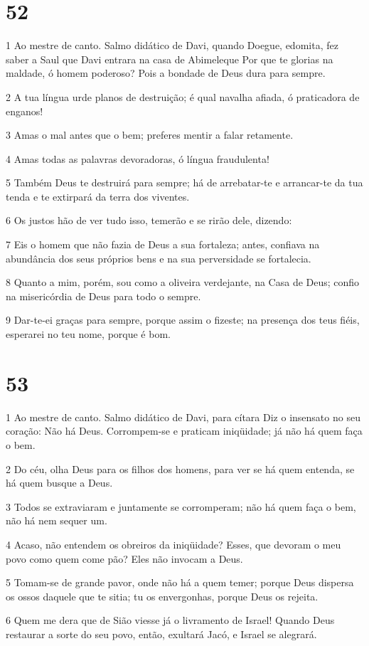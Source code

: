 \chapter{52}

\par 1 Ao mestre de canto. Salmo didático de Davi, quando Doegue, edomita, fez saber a Saul que Davi entrara na casa de Abimeleque Por que te glorias na maldade, ó homem poderoso? Pois a bondade de Deus dura para sempre.
\par 2 A tua língua urde planos de destruição; é qual navalha afiada, ó praticadora de enganos!
\par 3 Amas o mal antes que o bem; preferes mentir a falar retamente.
\par 4 Amas todas as palavras devoradoras, ó língua fraudulenta!
\par 5 Também Deus te destruirá para sempre; há de arrebatar-te e arrancar-te da tua tenda e te extirpará da terra dos viventes.
\par 6 Os justos hão de ver tudo isso, temerão e se rirão dele, dizendo:
\par 7 Eis o homem que não fazia de Deus a sua fortaleza; antes, confiava na abundância dos seus próprios bens e na sua perversidade se fortalecia.
\par 8 Quanto a mim, porém, sou como a oliveira verdejante, na Casa de Deus; confio na misericórdia de Deus para todo o sempre.
\par 9 Dar-te-ei graças para sempre, porque assim o fizeste; na presença dos teus fiéis, esperarei no teu nome, porque é bom.

\chapter{53}

\par 1 Ao mestre de canto. Salmo didático de Davi, para cítara Diz o insensato no seu coração: Não há Deus. Corrompem-se e praticam iniqüidade; já não há quem faça o bem.
\par 2 Do céu, olha Deus para os filhos dos homens, para ver se há quem entenda, se há quem busque a Deus.
\par 3 Todos se extraviaram e juntamente se corromperam; não há quem faça o bem, não há nem sequer um.
\par 4 Acaso, não entendem os obreiros da iniqüidade? Esses, que devoram o meu povo como quem come pão? Eles não invocam a Deus.
\par 5 Tomam-se de grande pavor, onde não há a quem temer; porque Deus dispersa os ossos daquele que te sitia; tu os envergonhas, porque Deus os rejeita.
\par 6 Quem me dera que de Sião viesse já o livramento de Israel! Quando Deus restaurar a sorte do seu povo, então, exultará Jacó, e Israel se alegrará.

